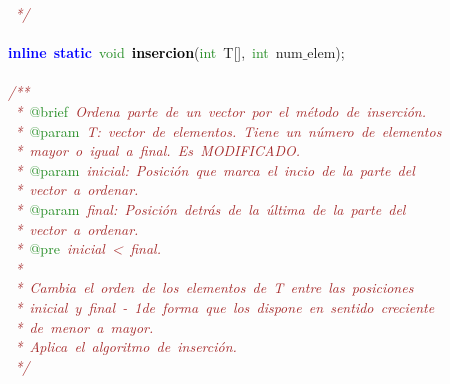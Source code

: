 \mbox{}\textit{\textcolor{Brown}{\ */}} \\
\mbox{} \\
\mbox{}\textbf{\textcolor{Blue}{inline}}\ \textbf{\textcolor{Blue}{static}}\ \textcolor{ForestGreen}{void}\ \textbf{\textcolor{Black}{insercion}}\textcolor{BrickRed}{(}\textcolor{ForestGreen}{int}\ T\textcolor{BrickRed}{[],}\ \textcolor{ForestGreen}{int}\ num$\_$elem\textcolor{BrickRed}{);} \\
\mbox{} \\
\mbox{}\textit{\textcolor{Brown}{/**}} \\
\mbox{}\textit{\textcolor{Brown}{\ *\ }}\textcolor{ForestGreen}{@brief}\textit{\textcolor{Brown}{\ Ordena\ parte\ de\ un\ vector\ por\ el\ método\ de\ inserción.}} \\
\mbox{}\textit{\textcolor{Brown}{\ *\ }}\textcolor{ForestGreen}{@param}\textit{\textcolor{Brown}{\ T:\ vector\ de\ elementos.\ Tiene\ un\ número\ de\ elementos\ }} \\
\mbox{}\textit{\textcolor{Brown}{\ *\ mayor\ o\ igual\ a\ final.\ Es\ MODIFICADO.}} \\
\mbox{}\textit{\textcolor{Brown}{\ *\ }}\textcolor{ForestGreen}{@param}\textit{\textcolor{Brown}{\ inicial:\ Posición\ que\ marca\ el\ incio\ de\ la\ parte\ del}} \\
\mbox{}\textit{\textcolor{Brown}{\ *\ vector\ a\ ordenar.}} \\
\mbox{}\textit{\textcolor{Brown}{\ *\ }}\textcolor{ForestGreen}{@param}\textit{\textcolor{Brown}{\ final:\ Posición\ detrás\ de\ la\ última\ de\ la\ parte\ del}} \\
\mbox{}\textit{\textcolor{Brown}{\ *\ vector\ a\ ordenar.\ }} \\
\mbox{}\textit{\textcolor{Brown}{\ *\ }}\textcolor{ForestGreen}{@pre}\textit{\textcolor{Brown}{\ inicial\ \textless{}\ final.}} \\
\mbox{}\textit{\textcolor{Brown}{\ *\ }} \\
\mbox{}\textit{\textcolor{Brown}{\ *\ Cambia\ el\ orden\ de\ los\ elementos\ de\ T\ entre\ las\ posiciones}} \\
\mbox{}\textit{\textcolor{Brown}{\ *\ inicial\ y\ final\ -\ 1de\ forma\ que\ los\ dispone\ en\ sentido\ creciente}} \\
\mbox{}\textit{\textcolor{Brown}{\ *\ de\ menor\ a\ mayor.}} \\
\mbox{}\textit{\textcolor{Brown}{\ *\ Aplica\ el\ algoritmo\ de\ inserción.}} \\
\mbox{}\textit{\textcolor{Brown}{\ */}} \\
